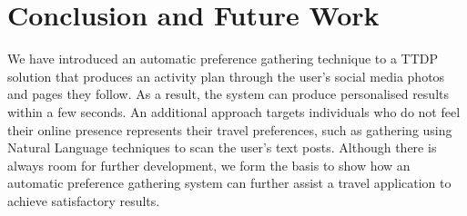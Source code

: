 
\section{Conclusion and Future Work}

We have introduced an automatic preference gathering technique to a TTDP
solution that produces an activity plan through the user's social media photos
and pages they follow. As a result, the system can produce personalised results
within a few seconds. An additional approach targets individuals who do not
feel their online presence represents their travel preferences, such as
gathering using Natural Language techniques to scan the user's text posts.
Although there is always room for further development, we form the basis to
show how an automatic preference gathering system can further assist a
travel application to achieve satisfactory results.

